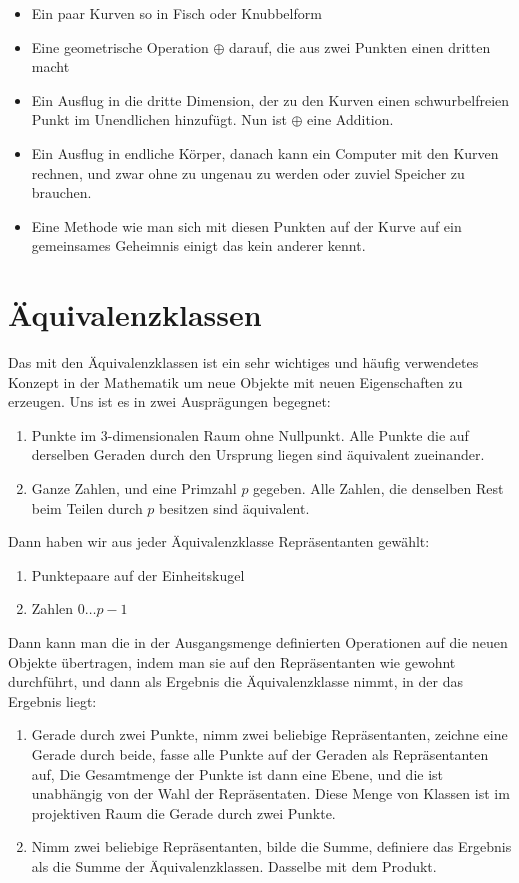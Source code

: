 \documentclass{article}
\begin{document}
\begin{itemize}
\item Ein paar Kurven so in Fisch oder Knubbelform
\item Eine geometrische Operation $\oplus$ darauf, die aus zwei Punkten einen
  dritten macht
\item Ein Ausflug in die dritte Dimension, der zu den Kurven einen
  schwurbelfreien Punkt im Unendlichen hinzufügt. Nun ist $\oplus$ eine
  Addition.
\item Ein Ausflug in endliche Körper, danach kann ein Computer mit den
  Kurven rechnen, und zwar ohne zu ungenau zu werden oder zuviel
  Speicher zu brauchen.
\item Eine Methode wie man sich mit diesen Punkten auf der Kurve auf ein
  gemeinsames Geheimnis einigt das kein anderer kennt.
\end{itemize}

\section{Äquivalenzklassen}
Das mit den Äquivalenzklassen ist ein sehr wichtiges und häufig verwendetes
Konzept in der Mathematik um neue Objekte mit neuen Eigenschaften zu
erzeugen. Uns ist es in zwei Ausprägungen begegnet:

\begin{enumerate}
\item Punkte im 3-dimensionalen Raum ohne Nullpunkt. Alle Punkte die auf derselben
   Geraden durch den Ursprung liegen sind äquivalent zueinander.
\item Ganze Zahlen, und eine Primzahl $p$ gegeben. Alle Zahlen, die denselben Rest
   beim Teilen durch $p$ besitzen sind äquivalent.
\end{enumerate}

Dann haben wir aus jeder Äquivalenzklasse Repräsentanten gewählt:

\begin{enumerate}
\item Punktepaare auf der Einheitskugel
\item Zahlen $0 \ldots p-1$
\end{enumerate}

Dann kann man die in der Ausgangsmenge definierten Operationen auf die neuen
Objekte übertragen, indem man sie auf den Repräsentanten wie gewohnt
durchführt, und dann als Ergebnis die Äquivalenzklasse nimmt, in der das
Ergebnis liegt:

\begin{enumerate}
\item Gerade durch zwei Punkte, nimm zwei beliebige Repräsentanten,
zeichne eine Gerade durch beide, fasse alle Punkte auf der Geraden als
Repräsentanten auf, Die Gesamtmenge der Punkte ist dann eine Ebene, und die
ist unabhängig von der Wahl der Repräsentaten. Diese Menge von Klassen ist im
projektiven Raum die Gerade durch zwei Punkte.
\item Nimm zwei beliebige Repräsentanten, bilde die Summe, definiere das
Ergebnis als die Summe der Äquivalenzklassen. Dasselbe mit dem Produkt.
\end{enumerate}
\end{document}
